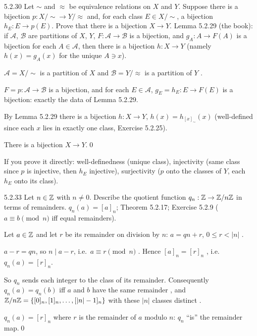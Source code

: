 \begin{bookex}[recommended]{5.2.30}
Let $\sim$ and $\approx$ be equivalence relations on $X$ and $Y$. Suppose there is a bijection $p:X/{\sim}\to Y/{\approx}$ and, for each class $E\in X/{\sim}$, a bijection $h_E:E\to p(E)$. Prove that there is a bijection $X\to Y$.
\solution
\given Lemma 5.2.29 (the book): if $\mathcal A$, $\mathcal B$ are partitions of $X$, $Y$, $F:\mathcal A\to\mathcal B$ is a bijection, and $g_A:A\to F(A)$ is a bijection for each $A\in\mathcal A$, then there is a bijection $h:X\to Y$ (namely $h(x)=g_A(x)$ for the unique $A\ni x$).
\begin{steps}
\item $\mathcal A=X/{\sim}$ is a partition of $X$ and $\mathcal B=Y/{\approx}$ is a partition of $Y$ .
\item $F=p:\mathcal A\to\mathcal B$ is a bijection, and for each $E\in\mathcal A$, $g_E=h_E:E\to F(E)$ is a bijection: exactly the data of Lemma 5.2.29.
\item By Lemma 5.2.29 there is a bijection $h:X\to Y$, $h(x)=h_{[x]_\sim}(x)$ (well-defined since each $x$ lies in exactly one class, Exercise 5.2.25).
\end{steps}
\conclusion There is a bijection $X\to Y$.\qed
\begin{compare}
\item If you prove it directly: well-definedness (unique class), injectivity (same class since $p$ is injective, then $h_E$ injective), surjectivity ($p$ onto the classes of $Y$, each $h_E$ onto its class).
\end{compare}
\end{bookex}

\begin{bookex}[essential]{5.2.33}
Let $n\in\mathbb{Z}$ with $n\ne0$. Describe the quotient function $q_n:\mathbb{Z}\to\mathbb{Z}/n\mathbb{Z}$ in terms of remainders.
\solution
\given $q_n(a)=[a]_n$; Theorem 5.2.17; Exercise 5.2.9 ($a\equiv b\pmod n$ iff equal remainders).
\begin{steps}
\item Let $a\in\mathbb{Z}$ and let $r$ be its remainder on division by $n$: $a=qn+r$, $0\le r<|n|$ .
\item $a-r=qn$, so $n\mid a-r$, i.e.\ $a\equiv r\pmod n$ . Hence $[a]_n=[r]_n$ , i.e.\ $q_n(a)=[r]_n$.
\item So $q_n$ sends each integer to the class of its remainder. Consequently $q_n(a)=q_n(b)$ iff $a$ and $b$ have the same remainder , and $\mathbb{Z}/n\mathbb{Z}=\{[0]_n,[1]_n,\dots,[|n|-1]_n\}$ with these $|n|$ classes distinct .
\end{steps}
\conclusion $q_n(a)=[r]_n$ where $r$ is the remainder of $a$ modulo $n$: $q_n$ ``is'' the remainder map.\qed
\end{bookex}

